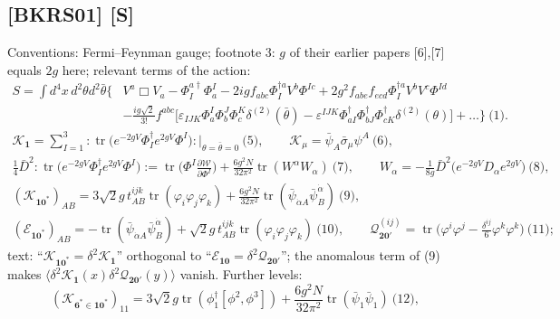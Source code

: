 \documentclass[10pt]{article}
\begin{document}
\subsection{[BKRS01] [S]}
Conventions: Fermi--Feynman gauge; footnote 3: $g$ of their earlier papers [6],[7] equals $2g$ here; relevant terms of the action:
\begin{equation*}
\begin{aligned}
S=\int d^4x\,d^2\theta d^2\bar\theta\Big\{&V^a\Box V_a-\Phi^{a\dagger}_I\Phi^I_a-2igf_{abc}\Phi^{\dagger a}_IV^b\Phi^{Ic}+2g^2f_{abe}f_{ecd}\Phi^{\dagger a}_IV^bV^c\Phi^{Id}\\
&-\frac{ig\sqrt2}{3!}f^{abc}\big[\varepsilon_{IJK}\Phi^I_a\Phi^J_b\Phi^K_c\delta^{(2)}(\bar\theta)-\varepsilon^{IJK}\Phi^\dagger_{aI}\Phi^\dagger_{bJ}\Phi^\dagger_{cK}\delta^{(2)}(\theta)\big]+\dots\Big\}\ \text{(1)}.
\end{aligned}
\end{equation*}
\begin{gather*}
\mathcal K_{\mathbf 1}=\sum_{I=1}^3:\operatorname{tr}\big(e^{-2gV}\Phi^\dagger_Ie^{2gV}\Phi^I\big):\big|_{\theta=\bar\theta=0}\ \text{(5)},\qquad \mathcal K_\mu=\bar\psi_A\bar\sigma_\mu\psi^A\ \text{(6)},\\
\tfrac14\bar D^2:\operatorname{tr}\big(e^{-2gV}\Phi_I^\dagger e^{2gV}\Phi^I\big):=\operatorname{tr}\Big(\Phi^I\frac{\partial\mathcal W}{\partial\Phi^I}\Big)+\frac{6g^2N}{32\pi^2}\operatorname{tr}(W^\alpha W_\alpha)\ \text{(7)},\qquad W_\alpha=-\frac1{8g}\bar D^2\big(e^{-2gV}D_\alpha e^{2gV}\big)\ \text{(8)},\\
(\mathcal K_{\mathbf{10}^*})_{AB}=3\sqrt2g\,t^{ijk}_{AB}\operatorname{tr}(\varphi_i\varphi_j\varphi_k)+\frac{6g^2N}{32\pi^2}\operatorname{tr}(\bar\psi_{\dot\alpha A}\bar\psi_B^{\dot\alpha})\ \text{(9)},\\
(\mathcal E_{\mathbf{10}^*})_{AB}=-\operatorname{tr}(\bar\psi_{\dot\alpha A}\bar\psi^{\dot\alpha}_B)+\sqrt2g\,t^{ijk}_{AB}\operatorname{tr}(\varphi_i\varphi_j\varphi_k)\ \text{(10)},\qquad \mathcal Q^{(ij)}_{\mathbf{20}'}=\operatorname{tr}\Big(\varphi^i\varphi^j-\frac{\delta^{ij}}6\varphi^k\varphi^k\Big)\ \text{(11)};
\end{gather*}
text: ``$\mathcal K_{\mathbf{10}^*}=\delta^2\mathcal K_{\mathbf 1}$'' orthogonal to ``$\mathcal E_{\mathbf{10}}=\delta^2\mathcal Q_{\mathbf{20}'}$''; the anomalous term of (9) makes $\langle\delta^2\mathcal K_{\mathbf 1}(x)\delta^2\mathcal Q_{\mathbf{20}'}(y)\rangle$ vanish. Further levels:
\begin{equation*}
(\mathcal K_{\mathbf 6^*\in\mathbf{10}^*})_{11}=3\sqrt2g\operatorname{tr}(\phi_1^\dagger[\phi^2,\phi^3])+\frac{6g^2N}{32\pi^2}\operatorname{tr}(\bar\psi_1\bar\psi_1)\ \text{(12)},
\end{equation*}
\end{document}
